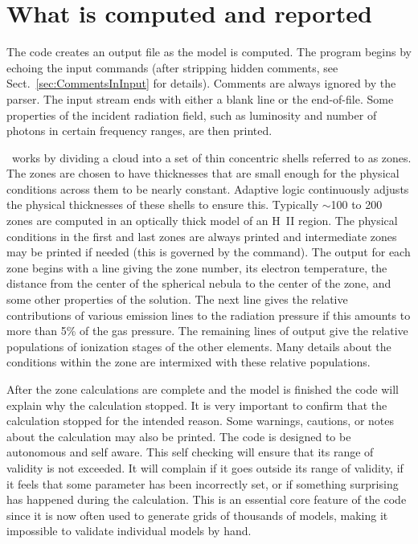 \section{What is computed and reported}

The code creates an output file as the model is computed.
The program begins by echoing the input commands (after stripping hidden
comments, see Sect.~\ref{sec:CommentsInInput} for details).  Comments are
always ignored by the parser.  The input stream ends with either a blank line or
the end-of-file.  Some properties of the incident radiation field, such
as luminosity and number of photons in certain frequency ranges, are then
printed.

\Cloudy\ works by dividing a cloud into a set of thin concentric shells
referred to as zones. The zones are chosen to have thicknesses that are
small enough for the physical conditions across them to be nearly constant.
Adaptive logic continuously adjusts the physical thicknesses of these shells
to ensure this.  Typically $\sim$100 to 200 zones are computed in an optically
thick model of an H~II region.  The physical conditions in the first and
last zones are always printed and intermediate zones may be printed if needed
(this is governed by the  command).
The output for each zone begins with a line giving the zone number, its
electron temperature, the distance from the center of the spherical nebula
to the center of the zone, and some other properties of the solution.  The
next line gives the relative contributions of various emission lines to
the radiation pressure if this amounts to more than 5\% of the gas pressure.
The remaining lines of output give the relative populations of
ionization stages of the other elements.
Many details about the conditions within the zone are
intermixed with these relative populations.

After the zone calculations are complete and the model is finished the
code will explain why the calculation stopped.  It is very important to
confirm that the calculation stopped for the intended reason.  Some warnings,
cautions, or notes about the calculation may also be printed.  The code
is designed to be autonomous and self aware.  This self checking will ensure
that its range of validity is not exceeded. It will complain if it goes
outside its range of validity, if it feels that some parameter has been
incorrectly set, or if something surprising has happened during the
calculation.  This is an essential core feature of the code since it is
now often used to generate grids of thousands of models, making it impossible
to validate individual models by hand.

